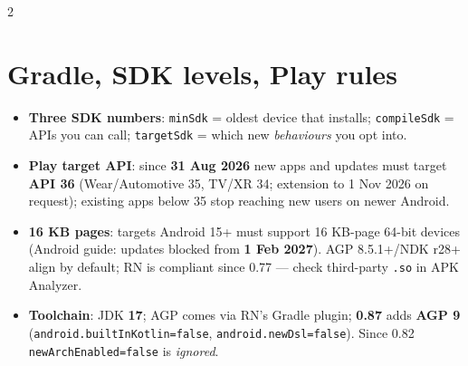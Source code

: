\documentclass[8pt]{extarticle}
\begin{document}

\begin{multicols}{2}
\raggedright

\section{Gradle, SDK levels, Play rules}
\begin{itemize}\raggedright
  \item \textbf{Three SDK numbers}: \texttt{minSdk} = oldest device that installs;
        \texttt{compileSdk} = APIs you can call; \texttt{targetSdk} = which new
        \emph{behaviours} you opt into.
  \item \textbf{Play target API}: since \textbf{31 Aug 2026} new apps and updates must target
        \textbf{API 36} (Wear/Automotive 35, TV/XR 34; extension to 1 Nov 2026 on request);
        existing apps below 35 stop reaching new users on newer Android.
  \item \textbf{16 KB pages}: targets Android 15+ must support 16 KB-page 64-bit devices
        (Android guide: updates blocked from \textbf{1 Feb 2027}). AGP 8.5.1+/NDK r28+ align by
        default; RN is compliant since 0.77 — check third-party \texttt{.so} in APK Analyzer.
  \item \textbf{Toolchain}: JDK \textbf{17}; AGP comes via RN's Gradle plugin; \textbf{0.87}
        adds \textbf{AGP 9} (\texttt{android.builtInKotlin=false}, \texttt{android.newDsl=false}).
        Since 0.82 \texttt{newArchEnabled=false} is \emph{ignored}.
\end{itemize}


\end{multicols}
\end{document}
